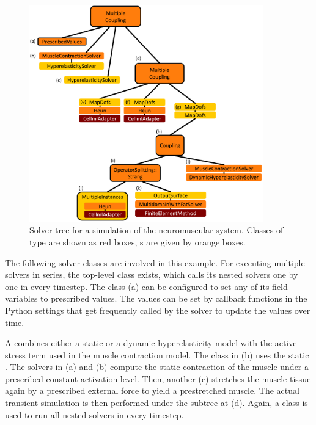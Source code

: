 \begin{figure}
  \centering%
  \includegraphics[width=0.9\textwidth]{images/implementation/solver_tree_multidomain_spindles.pdf}%
  \caption{Solver tree for a simulation of the neuromuscular system. Classes of type  are shown as red boxes, s are given by orange boxes.}%
  \label{fig:solver_tree_multidomain_spindles}%
\end{figure}

The following solver classes are involved in this example. For executing multiple solvers in series, the top-level  class exists, which calls its nested solvers one by one in every timestep.
The  class (a) can be configured to set any of its field variables to prescribed values. The values can be set by callback functions in the Python settings that get frequently called by the solver to update the values over time.

A  combines either a static or a dynamic hyperelasticity model with the active stress term used in the muscle contraction model. The class in (b) uses the static . The solvers in (a) and (b) compute the static contraction of the muscle under a prescribed constant activation level. Then, another  (c) stretches the muscle tissue again by a prescribed external force to yield a prestretched muscle. The actual transient simulation is then performed under the subtree at (d). 
Again, a  class is used to run all nested solvers in every timestep.

